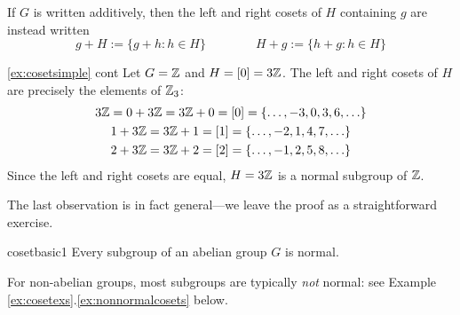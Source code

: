 If $G$ is written additively, then the left and right cosets of $H$ containing $g$ are instead written
\[g+H:=\{g+h:h\in H\}\qquad\qquad H+g:=\{h+g:h\in H\}\]

\begin{example*}{\ref{ex:cosetsimple} cont}{}
	Let $G=\mathbb{Z}$ and $H=[0]=3\mathbb{Z}$. The left and right cosets of $H$ are precisely the elements of $\mathbb{Z}_3$:
	\begin{gather*}
	3\mathbb{Z}=0+3\mathbb{Z}=3\mathbb{Z}+0=[0]=\{\ldots,-3,0,3,6,\ldots\}\\
	1+3\mathbb{Z}=3\mathbb{Z}+1=[1]=\{\ldots,-2,1,4,7,\ldots\}\\
	2+3\mathbb{Z}=3\mathbb{Z}+2=[2]=\{\ldots,-1,2,5,8,\ldots\}
	\end{gather*}
	Since the left and right cosets are equal, $H=3\mathbb{Z}$ is a normal subgroup of $\mathbb{Z}$.
\end{example*}

\goodbreak

The last observation is in fact general---we leave the proof as a straightforward exercise.

\begin{lemm}{}{cosetbasic1}
	Every subgroup of an abelian group $G$ is normal.
\end{lemm}


For non-abelian groups, most subgroups are typically \emph{not} normal: see Example \ref*{ex:cosetexs}.\ref{ex:nonnormalcosets} below.


